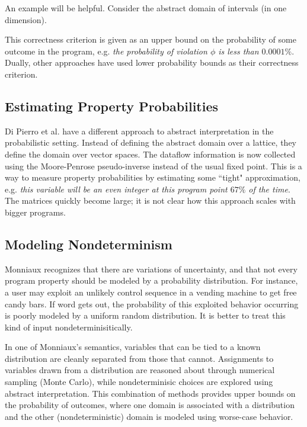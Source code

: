 An example will be helpful.
Consider the abstract domain of intervals (in one dimension).

This correctness criterion is given as an upper bound on the
probability of some outcome in the program, e.g. {\sl the
probability of violation $\phi$ is less than $0.0001\%$}.
Dually, other approaches have
used lower probability bounds as their correctness criterion.

\subsection{Estimating Property Probabilities}

Di Pierro et al. have a different approach to abstract 
interpretation in the probabilistic setting.
Instead of defining the abstract domain over a lattice, they
define the domain over vector spaces.
The dataflow information is now collected using the Moore-Penrose
pseudo-inverse instead of the usual fixed point.
This is a way to measure property probabilities by
estimating some ``tight" approximation, e.g.
{\sl this variable will be an even integer at this program point
$67\%$ of the time}.
The matrices quickly become large; it is not clear how this
approach scales with bigger programs.

\subsection{Modeling Nondeterminism}

Monniaux recognizes that there are variations of uncertainty,
and that not every program property should be modeled by a
probability distribution.
For instance, a user may exploit an unlikely control sequence
in a vending machine to get free candy bars. 
If word gets out, the probability of
this exploited behavior occurring is poorly modeled by a uniform 
random distribution.
It is better to treat this kind of input nondeterminisitically.

In one of Monniaux's semantics, variables that can be tied to a known
distribution are cleanly separated from those that cannot.
Assignments to variables drawn from a distribution are reasoned about
through numerical sampling (Monte Carlo), while nondeterminisic choices 
are explored using abstract interpretation.
This combination of methods provides upper bounds on the probability
of outcomes, where one domain is associated with a distribution 
and the other (nondeterministic) domain is modeled using worse-case 
behavior.

